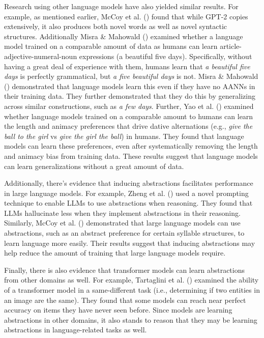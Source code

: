 \documentclass[
  12pt,
  letterpaper,
]{scrreport}
\begin{document}
Research using other language models have also yielded similar results.
For example, as mentioned earlier, McCoy et al.
() found that while GPT-2
copies extensively, it also produces both novel words as well as novel
syntactic structures. Additionally Misra \& Mahowald
() examined whether a
language model trained on a comparable amount of data as humans can
learn article-adjective-numeral-noun expressions (a beautiful five
days). Specifically, without having a great deal of experience with
them, humans learn that \emph{a beautiful five days} is perfectly
grammatical, but \emph{a five beautiful days} is not. Misra \& Mahowald
() demonstrated that
language models learn this even if they have no AANNs in their training
data. They further demonstrated that they do this by generalizing across
similar constructions, such as \emph{a few days}. Further, Yao et al.
() examined whether
language models trained on a comparable amount to humans can learn the
length and animacy preferences that drive dative alternations (e.g.,
\emph{give the ball to the girl} vs \emph{give the girl the ball}) in
humans. They found that language models can learn these preferences,
even after systematically removing the length and animacy bias from
training data. These results suggest that language models can learn
generalizations without a great amount of data.

Additionally, there's evidence that inducing abstractions facilitates
performance in large language models. For example, Zheng et al.
() used a novel prompting
technique to enable LLMs to use abstractions when reasoning. They found
that LLMs hallucinate less when they implement abstractions in their
reasoning. Similarly, McCoy et al.
()
demonstrated that large language models can use abstractions, such as an
abstract preference for certain syllable structures, to learn language
more easily. Their results suggest that inducing abstractions may help
reduce the amount of training that large language models require.

Finally, there is also evidence that transformer models can learn
abstractions from other domains as well. For example, Tartaglini et al.
() examined the
ability of a transformer model in a same-different task (i.e.,
determining if two entities in an image are the same). They found that
some models can reach near perfect accuracy on items they have never
seen before. Since models are learning abstractions in other domains, it
also stands to reason that they may be learning abstractions in
language-related tasks as well.
\end{document}
